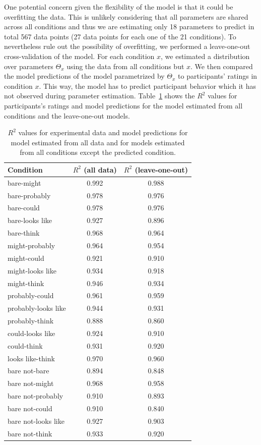 One potential concern given the flexibility of the model is that it could be overfitting the data. 
This is unlikely considering that all parameters are shared across all conditions and thus we are estimating only 18 parameters to predict in total 567 data points 
(27 data points for each one of the 21 conditions). To nevertheless rule out the possibility of overfitting, we performed a leave-one-out cross-validation of
the model. For each condition $x$, we estimated a distribution over parameters $\Theta_x$ using the data from all conditions but $x$. We then
compared the model predictions of the model parametrized by $\Theta_x$ to participants' ratings in condition $x$. This way, the model has to predict
participant behavior which it has not observed during parameter estimation. Table~\ref{tbl:correlations} shows the $R^2$ values for participants's
ratings and model predictions for the model estimated from all conditions and the leave-one-out models.

\begin{table}[ht!]
\center
\begin{tabular}{l | c | c}
      Condition & $R^2$ (all data) & $R^2$ (leave-one-out) \\
      \midrule
          bare-might  &  0.992  & 0.988 \\
       bare-probably  &  0.978  & 0.976 \\
          bare-could  &  0.978  & 0.976 \\
     bare-looks like  &  0.927  & 0.896 \\
          bare-think  &  0.968  & 0.964 \\
      might-probably  &  0.964  & 0.954 \\
         might-could  &  0.921  & 0.910 \\
    might-looks like  &  0.934  & 0.918 \\
         might-think  &  0.946  & 0.934 \\
      probably-could  &  0.961  & 0.959 \\
 probably-looks like  &  0.944  & 0.931 \\
      probably-think  &  0.888  & 0.860 \\
    could-looks like  &  0.924  & 0.910 \\
         could-think  &  0.931  & 0.920 \\
    looks like-think  &  0.970  & 0.960 \\
       bare not-bare  &  0.894  & 0.848 \\
      bare not-might  &  0.968  & 0.958 \\
   bare not-probably  &  0.910  & 0.893 \\
      bare not-could  &  0.910  & 0.840 \\
 bare not-looks like  &  0.927  & 0.903 \\
      bare not-think  &  0.933  & 0.920 \\
\end{tabular}
\caption{$R^2$ values for experimental data and model predictions for model estimated from all data and for models estimated from all conditions except the predicted condition. \label{tbl:correlations}}
\end{table}


